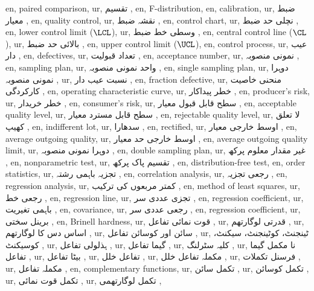 en, paired comparison,
ur, تقسیم ,
en, F-distribution,
en, calibration,
ur, ضبط معیار ,
en, quality control,
ur, نقشہ ضبط ,
en, control chart,
ur, نچلی حد ضبط ,
en, lower control limit ($\LCL $),
ur, وسطی خط ضبط ,
en, central control line ($\CL $),
ur, بالائی حد ضبط ,
en, upper control limit ($\UCL $),
en, control process,
ur, عیب دار ,
en, defectives,
ur, تعداد قبولیت ,
en, acceptance number,
ur, نمونی منصوبہ ,
en, sampling plan,
ur, واحد نمونی منصوبہ ,
en, single sampling plan,
ur, دوہرا نمونی منصوبہ ,
ur, نسبت عیب دار ,
en, fraction defective,
ur, منحنی خاصیت کارکردگی ,
en, operating characteristic curve,
ur, خطر پیداکار ,
en, producer's risk,
ur, خطر خریدار ,
en, consumer's risk,
ur, سطح قابل قبول معیار ,
en, acceptable quality level,
ur, سطح قابل مسترد معیار ,
en, rejectable quality level,
ur, لا تعلق کھیپ ,
en, indifferent lot,
ur, سدھارا ,
en, rectified,
ur, اوسط خارجی معیار ,
en, average outgoing quality,
ur, اوسط خارجی حد معیار ,
en, average outgoing quality limit,
ur, دوہرا نمونی منصوبہ ,
en, double sampling plan,
ur, غیر مقدار معلوم پرکھ ,
en, nonparametric test,
ur, تقسیم پاک پرکھ ,
en, distribution-free test,
en, order statistics,
ur, تجزیہ باہمی رشتہ ,
en, correlation analysis,
ur, رجعی تجزیہ ,
en, regression analysis,
ur, کمتر مربعوں کی ترکیب ,
en, method of least squares,
ur, رجعی خط ,
en, regression line,
ur, تجزی عددی سر ,
en, regression coefficient,
ur, باہمی تغیریت ,
en, covariance,
ur, رجعی عددی سر ,
en, regression coefficient,
ur, برینل سختی ,
en, Brinell hardness,
ur, قوت نمائی تفاعل ,
ur, قدرتی لوگارتھم ,
ur, اساس دس کا لوگارتھم ,
ur, سائن اور کوسائن تفاعل ,
ur, ٹینجنٹ، کوٹینجنٹ، سیکنٹ، کوسیکنٹ ,
ur, ہذلولی تفاعل ,
ur, گیما تفاعل ,
ur, کلیہ سٹرلنگ ,
ur, نا مکمل گیما تفاعل ,
ur, بیٹا تفاعل ,
ur, تفاعل خلل ,
ur, مکملہ تفاعل خلل ,
ur, فرسنل تکملات ,
ur, مکملہ تفاعل ,
en, complementary functions,
ur, تکمل سائن ,
ur, تکمل کوسائن ,
ur, تکمل قوت نمائی ,
ur, تکمل لوگارتھمی ,
